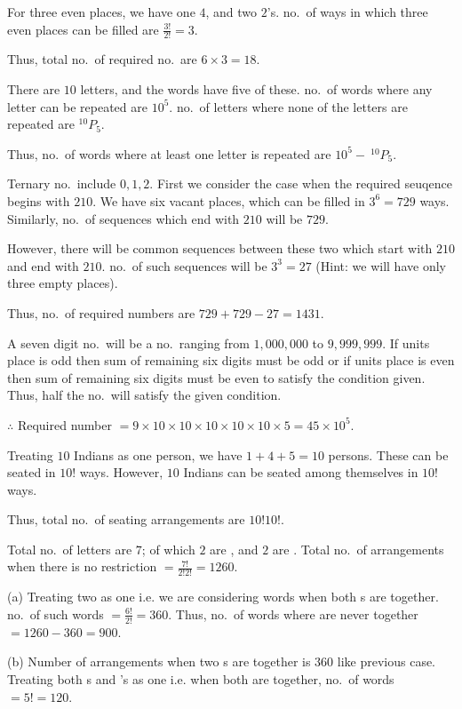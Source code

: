   For three even places, we have one $4$, and two $2$'s. no.\ of ways in which three even places can be
  filled are $\frac{3!}{2!} = 3$.

  Thus, total no.\ of required no.\ are $6\times3 = 18$.
\item There are $10$ letters, and the words have five of these. no.\ of words where any letter can be
  repeated are $10^5$. no.\ of letters where none of the letters are repeated are $^{10}P_5$.

  Thus, no.\ of words where at least one letter is repeated are $10^5 - \ ^{10}P_5$.
\item Ternary no.\ include $0, 1, 2$. First we consider the case when the required seuqence begins with
  $210$. We have six vacant places, which can be filled in $3^6 = 729$ ways. Similarly, no.\ of sequences
  which end with $210$ will be $729$.

  However, there will be common sequences between these two which start with $210$ and end with
  $210$. no.\ of such sequences will be $3^3 = 27$ (Hint: we will have only three empty places).

  Thus, no.\ of required numbers are $729 + 729 - 27 = 1431$.
\item A seven digit no.\ will be a no.\ ranging from $1,000,000$ to $9,999,999$. If units place is odd then
  sum of remaining six digits must be odd or if units place is even then sum of remaining six digits
  must be even to satisfy the condition given. Thus, half the no.\ will satisfy the given condition.

  $\therefore $ Required number $= 9\times10\times10\times10\times10\times10\times5 = 45\times10^5$.
\item Treating $10$ Indians as one person, we have $1 + 4 + 5 = 10$ persons. These can be seated in $10!$
  ways. However, $10$ Indians can be seated among themselves in $10!$ ways.

  Thus, total no.\ of seating arrangements are $10!10!$.
\item Total no.\ of letters are $7$; of which $2$ are , and $2$ are . Total no.\ of
  arrangements when there is no restriction $=\frac{7!}{2!2!} = 1260$.

  (a) Treating two  as one i.e. we are considering words when both s are together. no.\ of
  such words $=\frac{6!}{2!} = 360$. Thus, no.\ of words where  are never together $= 1260 - 360 =
  900$.

  (b) Number of arrangements when two s are together is $360$ like previous case. Treating both
  s and 's as one i.e. when both are together, no.\ of words $=5! = 120$.

